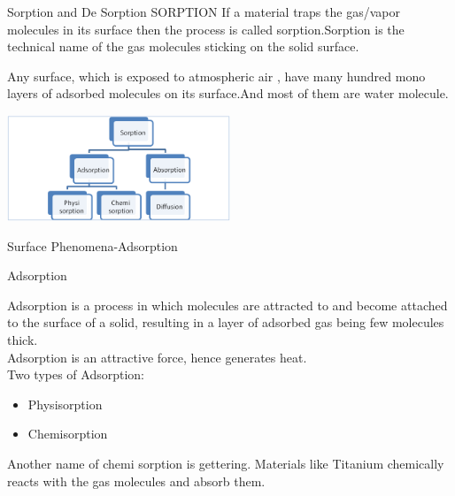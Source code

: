 \documentclass[11]{beamer}
\begin{document}
\begin{frame}{Sorption and De Sorption}
 SORPTION If a material traps the gas/vapor molecules in its surface then the  process is called sorption.Sorption is the technical name of the gas molecules sticking on the solid surface.\break

Any surface, which is exposed to atmospheric air , have many hundred mono layers of adsorbed molecules on its surface.And most of them are water molecule.  

    \begin{center}
   			\includegraphics[width=0.5\textwidth]{Sorption.png}
  	 \end{center}

\end{frame}





\begin{frame}{Surface Phenomena-Adsorption}


\begin{exampleblock}{Adsorption}

Adsorption is a process in which molecules are attracted to and become attached to the surface of a solid, resulting in a layer of adsorbed gas being few molecules thick.\\
Adsorption is an attractive force, hence generates heat.\\
Two types of Adsorption:\\

		\begin{center}
 				\begin{itemize}
         			\item Physisorption
					\item Chemisorption
		 		\end{itemize}
		
		\end{center}
	
Another name of chemi sorption is gettering. Materials like Titanium chemically reacts with the gas molecules and absorb them.	   


\end{exampleblock}	


\end{frame}
\end{document}
